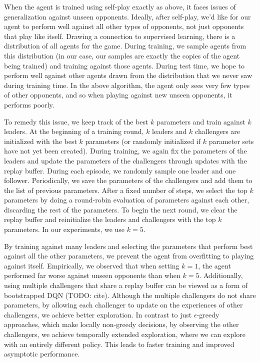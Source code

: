 \documentclass[10pt,twocolumn,letterpaper]{article}
\begin{document}
When the agent is trained using self-play exactly as above, it faces issues of
generalization against unseen opponents. Ideally, after self-play, we'd like
for our agent to perform well against all other types of opponents, not just
opponents that play like itself. Drawing a connection to supervised learning,
there is a distribution of all agents for the game. During training, we sample
agents from this distribution (in our case, our samples are exactly the copies
of the agent being trained) and training against those agents. During test
time, we hope to perform well against other agents drawn from the distribution
that we never saw during training time. In the above algorithm, the agent only
sees very few types of other opponents, and so when playing against new unseen
opponents, it performs poorly.

To remedy this issue, we keep track of the best $k$ parameters and train
against $k$ leaders. At the beginning of a training round, $k$ leaders and $k$
challengers are initialized with the best $k$ parameters (or randomly
initialized if $k$ parameter sets have not yet been created). During training,
we again fix the parameters of the leaders and update the parameters of the
challengers through updates with the replay buffer. During each episode, we
randomly sample one leader and one follower. Periodically, we save the
parameters of the challengers and add them to the list of previous parameters.
After a fixed number of steps, we select the top $k$ parameters by doing a
round-robin evaluation of parameters against each other, discarding the rest
of the parameters. To begin the next round, we clear the replay buffer and
reinitialize the leaders and challengers with the top $k$ parameters. In our
experiments, we use $k = 5$.

By training against many leaders and selecting the parameters that perform
best against all the other parameters, we prevent the agent from overfitting
to playing against itself. Empirically, we observed that when setting $k = 1$,
the agent performed far worse against unseen opponents than when $k = 5$.
Additionally, using multiple challengers that share a replay buffer can be
viewed as a form of bootstrapped DQN (TODO: cite). Although the multiple
challengers do not share parameters, by allowing each challenger to update on
the experiences of other challengers, we achieve better exploration. In
contrast to just $\epsilon$-greedy approaches, which make locally non-greedy
decisions, by observing the other challengers, we achieve temporally extended
exploration, where we can explore with an entirely different policy. This
leads to faster training and improved asymptotic performance.
\end{document}

